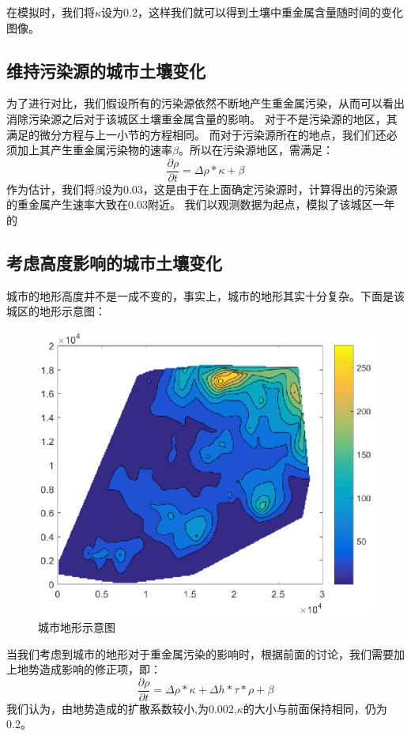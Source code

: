 \documentclass[a4paper]{article}
\begin{document}
在模拟时，我们将$\kappa$设为0.2，这样我们就可以得到土壤中重金属含量随时间的变化图像。
\subsection{维持污染源的城市土壤变化}
为了进行对比，我们假设所有的污染源依然不断地产生重金属污染，从而可以看出消除污染源之后对于该城区土壤重金属含量的影响。
对于不是污染源的地区，其满足的微分方程与上一小节的方程相同。
而对于污染源所在的地点，我们们还必须加上其产生重金属污染物的速率$\beta$。所以在污染源地区，需满足：
\begin{equation}
 \frac{\partial \rho}{\partial t}= \Delta \rho * \kappa + \beta
\end{equation}
作为估计，我们将$\beta$设为0.03，这是由于在上面确定污染源时，计算得出的污染源的重金属产生速率大致在0.03附近。
我们以观测数据为起点，模拟了该城区一年的
\subsection{考虑高度影响的城市土壤变化}
城市的地形高度并不是一成不变的，事实上，城市的地形其实十分复杂。下面是该城区的地形示意图：
\begin{figure}
    \centering 
    \includegraphics[scale=0.8]{pictures/height.eps}
    \caption{城市地形示意图}
    \label{fig:height}
\end{figure}
当我们考虑到城市的地形对于重金属污染的影响时，根据前面的讨论，我们需要加上地势造成影响的修正项，即：
\begin{equation}
 \frac{\partial \rho}{\partial t}= \Delta \rho * \kappa + \Delta h * \tau * \rho + \beta
\end{equation}
我们认为，由地势造成的扩散系数较小,为0.002,$\kappa$的大小与前面保持相同，仍为0.2。
\end{document}
